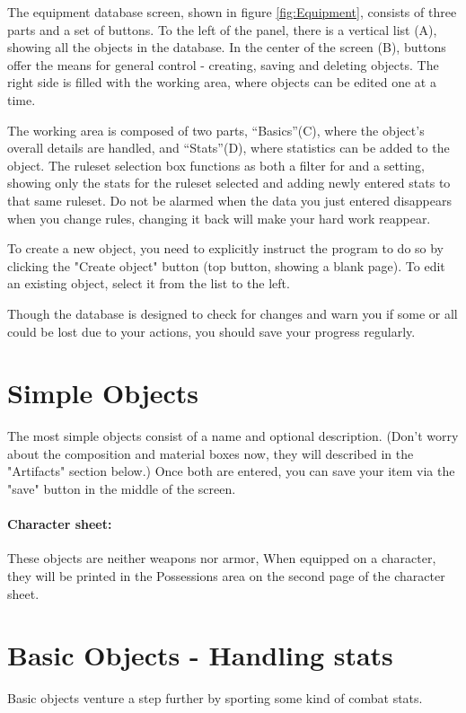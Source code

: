 The equipment database screen, shown in figure \ref{fig:Equipment}, consists of three parts and a set of buttons. To the left of the panel, there is a vertical list (A), showing all the objects in the database. In the center of the screen (B), buttons offer the means for general control - creating, saving and deleting objects. The right side is filled with the working area, where objects can be edited one at a time.

The working area is composed of two parts, "`Basics"'(C), where the object's overall details are handled, and "`Stats"'(D), where statistics can be added to the object. The ruleset selection box functions as both a filter for and a setting, showing only the stats for the ruleset selected and adding newly entered stats to that same ruleset. Do not be alarmed when the data you just entered disappears when you change rules, changing it back will make your hard work reappear.

To create a new object, you need to explicitly instruct the program to do so by clicking the "Create object" button (top button, showing a blank page). To edit an existing object, select it from the list to the left. 

Though the database is designed to check for changes and warn you if some or all could be lost due to your actions, you should save your progress regularly.

\section{Simple Objects}
The most simple objects consist of a name and optional description. (Don't worry about the composition and material boxes now, they will described in the "Artifacts" section below.) Once both are entered, you can save your item via the "save" button in the middle of the screen.

\paragraph{Character sheet:} These objects are neither weapons nor armor, When equipped on a character, they will be printed in the Possessions area on the second page of the character sheet.

\section{Basic Objects - Handling stats}
Basic objects venture a step further by sporting some kind of combat stats. 

